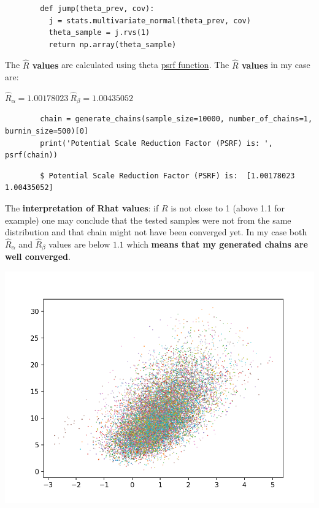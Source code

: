 \documentclass[11pt,a4paper,english]{article}
\begin{document}
      \begin{verbatim}
        def jump(theta_prev, cov):
          j = stats.multivariate_normal(theta_prev, cov)
          theta_sample = j.rvs(1)
          return np.array(theta_sample)
      \end{verbatim}

      The \textbf{$\widehat{R}$ values} are calculated using theta
      \href{https://github.com/avehtari/BDA_course_Aalto/blob/master/exercises/additional_files/psrf.py}{psrf function}.
      The \textbf{$\widehat{R}$ values} in my case are:

      \begin{center}
        \begin{math}
          \widehat{R}_{\alpha} = 1.00178023 \
          \widehat{R}_{\beta} = 1.00435052
        \end{math}
      \end{center}

      \begin{verbatim}
        chain = generate_chains(sample_size=10000, number_of_chains=1, burnin_size=500)[0]
        print('Potential Scale Reduction Factor (PSRF) is: ', psrf(chain))
      \end{verbatim}

      \begin{verbatim}
        $ Potential Scale Reduction Factor (PSRF) is:  [1.00178023 1.00435052]
      \end{verbatim}

      The \textbf{interpretation of Rhat values}: if $R$ is not close to 1
      (above 1.1 for example) one may conclude that the tested samples were not
      from the same distribution and that chain might not have been converged yet.
      In my case both $\widehat{R}_{\alpha}$ and $\widehat{R}_{\beta}$ values are
      below $1.1$ which \textbf{means that my generated chains are well converged}.

      \includegraphics[width=17.7cm]{1_scatter_plot.png}
\end{document}
